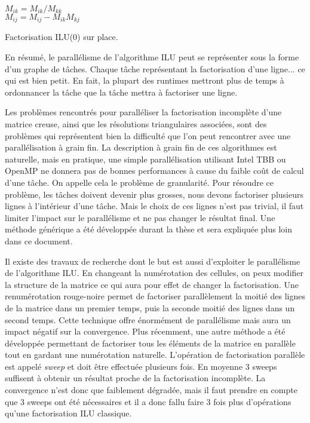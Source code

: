 \begin{algorithm}
   {
     {
      $M_{ik} = M_{ik} / M_{kk}$ \\
       {
        $M_{ij} = M_{ij} - M_{ik}M_{kj}$ \\
      }
    }
  }
  \caption{Factorisation ILU(0) sur place.}
  \label{algo:ilu0}
\end{algorithm}


En résumé, le parallélisme de l'algorithme ILU peut se représenter sous la forme d'un graphe de tâches.
%
Chaque tâche représentant la factorisation d'une ligne... ce qui est bien petit.
%
En fait, la plupart des runtimes mettront plus de temps à ordonnancer la tâche que la tâche mettra à factoriser une ligne.


Les problèmes rencontrés pour paralléliser la factorisation incomplète d'une matrice creuse, ainsi que les résolutions triangulaires associées, sont des problèmes qui représentent bien la difficulté que l'on peut rencontrer avec une parallélisation à grain fin.
%
La description à grain fin de ces algorithmes est naturelle, mais en pratique, une simple parallélisation utilisant Intel TBB ou OpenMP ne donnera pas de bonnes performances à cause du faible coût de calcul d'une tâche.
%
On appelle cela le problème de granularité.
%
Pour résoudre ce problème, les tâches doivent devenir plus grosses, nous devons factoriser plusieurs lignes à l'intérieur d'une tâche.
%
Mais le choix de ces lignes n'est pas trivial, il faut limiter l'impact sur le parallélisme et ne pas changer le résultat final.
%
Une méthode générique a été développée durant la thèse et sera expliquée plus loin dans ce document.


Il existe des travaux de recherche dont le but est aussi d'exploiter le parallélisme de l'algorithme ILU.
%
En changeant la numérotation des cellules, on peux modifier la structure de la matrice ce qui aura pour effet de changer la factorisation.
%
Une renumérotation rouge-noire permet de factoriser parallèlement la moitié des lignes de la matrice dans un premier temps, puis la seconde moitié des lignes dans un second temps.
%
Cette technique offre énormément de parallélisme mais aura un impact négatif sur la convergence\cite{red_black_ilu}.
%
Plus récemment, une autre méthode a été développée permettant de factoriser tous les éléments de la matrice en parallèle tout en gardant une numérotation naturelle.
%
L'opération de factorisation parallèle est appelé {\em sweep} et doit être effectuée plusieurs fois\cite{chow2014fine}.
%
En moyenne 3 sweeps suffisent à obtenir un résultat proche de la factorisation incomplète.
%
La convergence n'est donc que faiblement dégradée, mais il faut prendre en compte que 3 sweeps ont été nécessaires et il a donc fallu faire 3 fois plus d'opérations qu'une factorisation ILU classique.


